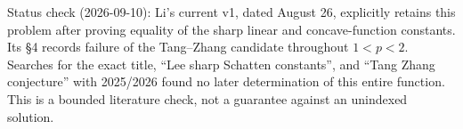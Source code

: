 \documentclass[11pt,a4paper]{article}
\begin{document}
Status check (2026-09-10): Li's current v1, dated August 26, explicitly
retains this problem after proving equality of the sharp linear and
concave-function constants. Its §4 records failure of the Tang--Zhang
candidate throughout \(1< p<2\). Searches for the exact title, ``Lee
sharp Schatten constants'', and ``Tang Zhang conjecture'' with 2025/2026
found no later determination of this entire function. This is a bounded
literature check, not a guarantee against an unindexed solution.
\end{document}
